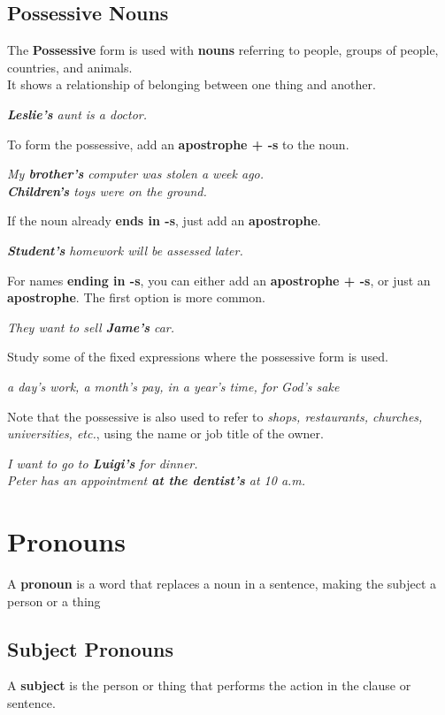 \documentclass[hidelinks,10pt,a4paper]{article}
\begin{document}
\subsection{Possessive Nouns}
The \textbf{Possessive} form is used with \textbf{nouns} referring to people, groups of people, countries, and animals.\\
It shows a relationship of belonging between one thing and another.
\begin{center}
		\textit{ \textbf{Leslie's} aunt is a doctor.}
\end{center}
To form the possessive, add an \textbf{apostrophe + -s} to the noun.
\begin{center}
\textit{My \textbf{brother's} computer was stolen a week ago.\\
		\textbf{Children's} toys were on the ground.\\}
\end{center}
If the noun already \textbf{ends in -s}, just add an \textbf{apostrophe}.
\begin{center}
\textit{ \textbf{Student's} homework will be assessed later.}
\end{center}
For names \textbf{ending in -s}, you can either add an \textbf{apostrophe + -s}, or just an \textbf{apostrophe}. The first option is more common.
\begin{center}
\textit{They want to sell \textbf{Jame's }car.}
\end{center}
Study some of the fixed expressions where the possessive form is used.
\begin{center}
\textit{a day's work, a month's pay, in a year's time, for God's sake}
\end{center}
Note that the possessive is also used to refer to \textit{shops, restaurants, churches, universities, etc.}, using the name or job title of the owner.
\begin{center}
\textit{
		I want to go to \textbf{Luigi's} for dinner.\\
		Peter has an appointment \textbf{at the dentist's} at 10 a.m.
}
\end{center}
\section{Pronouns}
A \textbf{pronoun} is a word that replaces a noun in a sentence, making the subject a person or a thing
\subsection{Subject Pronouns}
A \textbf{subject} is the person or thing that performs the action in the clause or sentence.
\end{document}
